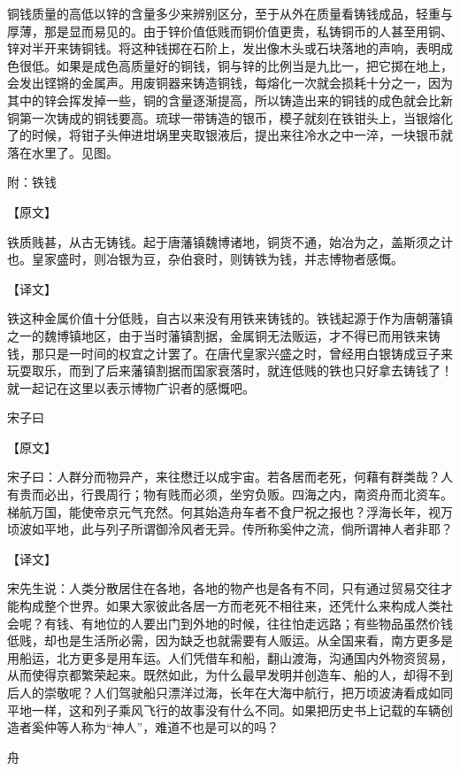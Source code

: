 \documentclass[12pt,UTF8]{ctexbook}
\begin{document}
铜钱质量的高低以锌的含量多少来辨别区分，至于从外在质量看铸钱成品，轻重与厚薄，那是显而易见的。由于锌价值低贱而铜价值更贵，私铸铜币的人甚至用铜、锌对半开来铸铜钱。将这种钱掷在石阶上，发出像木头或石块落地的声响，表明成色很低。如果是成色高质量好的铜钱，铜与锌的比例当是九比一，把它掷在地上，会发出铿锵的金属声。用废铜器来铸造铜钱，每熔化一次就会损耗十分之一，因为其中的锌会挥发掉一些，铜的含量逐渐提高，所以铸造出来的铜钱的成色就会比新铜第一次铸成的铜钱要高。琉球一带铸造的银币，模子就刻在铁钳头上，当银熔化了的时候，将钳子头伸进坩埚里夹取银液后，提出来往冷水之中一淬，一块银币就落在水里了。见图。

附：铁钱

【原文】

铁质贱甚，从古无铸钱。起于唐藩镇魏博诸地，铜货不通，始冶为之，盖斯须之计也。皇家盛时，则冶银为豆，杂伯衰时，则铸铁为钱，并志博物者感慨。





【译文】

铁这种金属价值十分低贱，自古以来没有用铁来铸钱的。铁钱起源于作为唐朝藩镇之一的魏博镇地区，由于当时藩镇割据，金属铜无法贩运，才不得已而用铁来铸钱，那只是一时间的权宜之计罢了。在唐代皇家兴盛之时，曾经用白银铸成豆子来玩耍取乐，而到了后来藩镇割据而国家衰落时，就连低贱的铁也只好拿去铸钱了！就一起记在这里以表示博物广识者的感慨吧。

宋子曰

【原文】

宋子曰：人群分而物异产，来往懋迁以成宇宙。若各居而老死，何藉有群类哉？人有贵而必出，行畏周行；物有贱而必须，坐穷负贩。四海之内，南资舟而北资车。梯航万国，能使帝京元气充然。何其始造舟车者不食尸祝之报也？浮海长年，视万顷波如平地，此与列子所谓御泠风者无异。传所称奚仲之流，倘所谓神人者非耶？

【译文】

宋先生说：人类分散居住在各地，各地的物产也是各有不同，只有通过贸易交往才能构成整个世界。如果大家彼此各居一方而老死不相往来，还凭什么来构成人类社会呢？有钱、有地位的人要出门到外地的时候，往往怕走远路；有些物品虽然价钱低贱，却也是生活所必需，因为缺乏也就需要有人贩运。从全国来看，南方更多是用船运，北方更多是用车运。人们凭借车和船，翻山渡海，沟通国内外物资贸易，从而使得京都繁荣起来。既然如此，为什么最早发明并创造车、船的人，却得不到后人的崇敬呢？人们驾驶船只漂洋过海，长年在大海中航行，把万顷波涛看成如同平地一样，这和列子乘风飞行的故事没有什么不同。如果把历史书上记载的车辆创造者奚仲等人称为“神人”，难道不也是可以的吗？

舟
\end{document}
